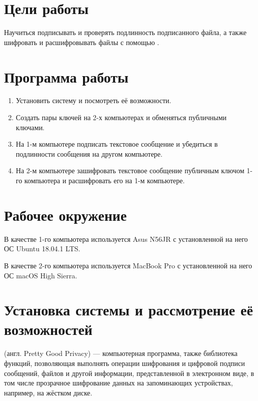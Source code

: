 





\tableofcontents
\lstlistoflistings
\newpage

\section{Цели работы}

Научиться подписывать и проверять подлинность подписанного файла, а также шифровать и расшифровывать файлы с помощью .

\section{Программа работы}

\begin{enumerate}
	\item Установить  систему и посмотреть её возможности.
	\item Создать пары  ключей на 2-х компьютерах и обменяться публичными ключами.
	\item На 1-м компьютере подписать текстовое сообщение и убедиться в подлинности сообщения на другом компьютере.
	\item На 2-м компьютере зашифровать текстовое сообщение публичным ключом 1-го компьютера и расшифровать его на 1-м компьютере.
\end{enumerate}

\section{Рабочее окружение}

В качестве 1-го компьютера используется Asus N56JR с установленной на него ОС Ubuntu 18.04.1 LTS.

В качестве 2-го компьютера используется MacBook Pro с установленной на него ОС macOS High Sierra.

\section{Установка  системы  и рассмотрение её возможностей}

 (англ. Pretty Good Privacy) --- компьютерная программа, также библиотека функций, позволяющая выполнять операции шифрования и цифровой подписи сообщений, файлов и другой информации, представленной в электронном виде, в том числе прозрачное шифрование данных на запоминающих устройствах, например, на жёстком диске.

